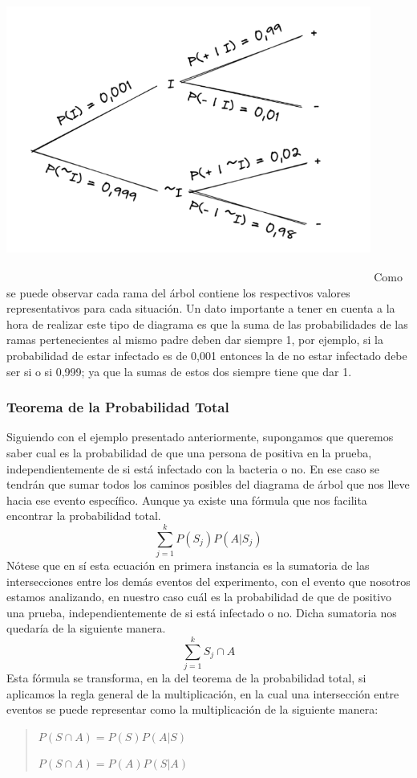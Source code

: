 \documentclass[]{article}
\begin{document}
\includegraphics[width=12cm, height=10cm]{imagenes/diagrama_arbol.png}
Como se puede observar cada rama del árbol contiene los respectivos valores representativos para cada situación. Un dato importante a tener en cuenta a la hora de realizar este tipo de diagrama es que la suma de las probabilidades de las ramas pertenecientes al mismo padre deben dar siempre 1, por ejemplo, si la probabilidad de estar infectado es de 0,001 entonces la de no estar infectado debe ser si o si 0,999; ya que la sumas de estos dos siempre tiene que dar 1.
\subsubsection*{Teorema de la Probabilidad Total}
Siguiendo con el ejemplo presentado anteriormente, supongamos que queremos saber cual es la probabilidad de que una persona de positiva en la prueba, independientemente de si está infectado con la bacteria o no.
En ese caso se tendrán que sumar todos los caminos posibles del diagrama de árbol que nos lleve hacia ese evento específico. Aunque ya existe una fórmula que nos facilita encontrar la probabilidad total.
\[ \sum_{j=1}^{k} P(S_j)P(A|S_j) \]
Nótese que en sí esta ecuación en primera instancia es la sumatoria de las intersecciones entre los demás eventos del experimento, con el evento que nosotros estamos analizando, en nuestro caso cuál es la probabilidad de que de positivo una prueba, independientemente de si está infectado o no. Dicha sumatoria nos quedaría de la siguiente manera.
\[ \sum_{j=1}^{k} S_j \cap A \]
Esta fórmula se transforma, en la del teorema de la probabilidad total, si aplicamos la regla general de la multiplicación, en la cual una intersección entre eventos se puede representar como la multiplicación de la siguiente manera:
\begin{quote}
	\item $P(S \cap A) = P(S)P(A|S)$
	\item $P(S \cap A) = P(A)P(S|A)$
\end{quote}
\end{document}
